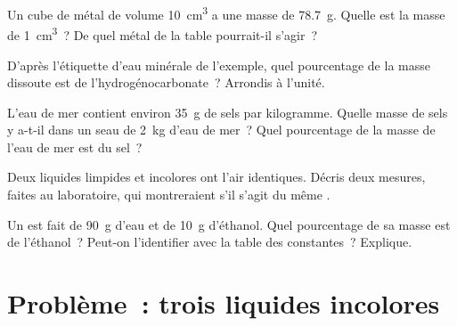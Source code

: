 \begin{exercise}[$\star\star$]\label{exo:g6:pure-substances-and-mixtures:8}
Un cube de métal de volume \qty{10}{cm^3} a une masse de \qty{78.7}{g}.
Quelle est la masse de \qty{1}{cm^3}~? De quel métal de la table
pourrait-il s'agir~?
\end{exercise}

\begin{exercise}[$\star\star$]\label{exo:g6:pure-substances-and-mixtures:9}
D'après l'étiquette d'eau minérale de l'exemple, quel pourcentage de la
masse dissoute est de l'hydrogénocarbonate~? Arrondis à l'unité.
\end{exercise}

\begin{exercise}[$\star\star$]\label{exo:g6:pure-substances-and-mixtures:10}
L'eau de mer contient environ \qty{35}{g} de sels par kilogramme. Quelle
masse de sels y a-t-il dans un seau de \qty{2}{kg} d'eau de mer~? Quel
pourcentage de la masse de l'eau de mer est du sel~?
\end{exercise}

\begin{exercise}[$\star\star\star$]\label{exo:g6:pure-substances-and-mixtures:11}
Deux liquides limpides et incolores ont l'air identiques. Décris deux
mesures, faites au laboratoire, qui montreraient s'il s'agit du même
.
\end{exercise}

\begin{exercise}[$\star\star\star$]\label{exo:g6:pure-substances-and-mixtures:12}
Un  est fait de \qty{90}{g} d'eau et de \qty{10}{g} d'éthanol.
Quel pourcentage de sa masse est de l'éthanol~? Peut-on l'identifier
avec la table des constantes~? Explique.
\end{exercise}

\section{Problème~: trois liquides incolores}

